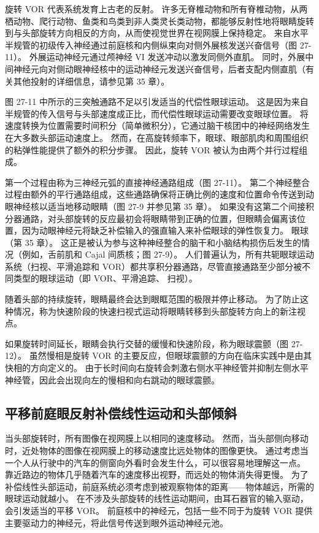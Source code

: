 旋转 VOR 代表系统发育上古老的反射。 许多无脊椎动物和所有脊椎动物，从两栖动物、爬行动物、鱼类和鸟类到非人类灵长类动物，都能够反射性地将眼睛旋转到与头部旋转方向相反的方向，从而使视觉世界在视网膜上保持稳定。 来自水平半规管的初级传入神经通过前庭核和内侧纵束向对侧外展核发送兴奋信号（图 27-11）。 外展运动神经元通过颅神经 VI 发送冲动以激发同侧外直肌。 同时，外展中间神经元向对侧动眼神经核中的运动神经元发送兴奋信号，后者支配内侧直肌（有关其他投射的详细信息，请参见第 35 章）。

图 27-11 中所示的三突触通路不足以引发适当的代偿性眼球运动。 这是因为来自半规管的传入信号与头部速度成正比，而代偿性眼球运动需要改变眼球位置。 将速度转换为位置需要时间积分（简单微积分），它通过脑干核团中的神经网络发生在大多数头部运动速度上。 然而，在高旋转频率下，眼球、眼部肌肉和周围组织的粘弹性能提供了额外的积分步骤。 因此，旋转 VOR 被认为由两个并行过程组成。

第一个过程由称为三神经元弧的直接神经通路组成（图 27-11）。 第二个神经整合过程由额外的平行通路组成，这些通路确保将正确比例的速度和位置命令传送到动眼神经核以适当地移动眼睛（图 27-9 并参见第 35 章）。 如果没有这第二个间接积分器通路，对头部旋转的反应最初会将眼睛带到正确的位置，但眼睛会偏离该位置，因为动眼神经元将缺乏补偿输入的强直输入来补偿眼球的弹性恢复力。 眼球（第 35 章）。 这正是被认为参与这种神经整合的脑干和小脑结构损伤后发生的情况（例如，舌前肌和 Cajal 间质核；图 27-9）。 人们普遍认为，所有共轭眼球运动系统（扫视、平滑追踪和 VOR）都共享积分器通路，尽管直接通路至少部分被不同类型的眼球运动（即 VOR、平滑追踪、 扫视）。

随着头部的持续旋转，眼睛最终会达到眼眶范围的极限并停止移动。 为了防止这种情况，称为快速阶段的快速扫视式运动将眼睛转移到头部旋转方向上的新注视点。

如果旋转时间延长，眼睛会执行交替的缓慢和快速阶段，称为眼球震颤（图 27-12）。 虽然慢相是旋转 VOR 的主要反应，但眼球震颤的方向在临床实践中是由其快相的方向定义的。 由于长时间向右旋转会刺激右侧水平神经管并抑制左侧水平神经管，因此会出现向左的慢相和向右跳动的眼球震颤。

\subsection{平移前庭眼反射补偿线性运动和头部倾斜}
当头部旋转时，所有图像在视网膜上以相同的速度移动。 然而，当头部侧向移动时，近处物体的图像在视网膜上的移动速度比远处物体的图像更快。 通过考虑当一个人从行驶中的汽车的侧窗向外看时会发生什么，可以很容易地理解这一点。 靠近路边的物体几乎随着汽车的速度移出视野，而远处的物体消失得更慢。 为了补偿线性头部运动，前庭系统必须考虑到被观察物体的距离——物体越远，所需的眼球运动就越小。 在不涉及头部旋转的线性运动期间，由耳石器官的输入驱动，会引发适当的平移 VOR。 前庭核中的神经元，包括一些不同于为旋转 VOR 提供主要驱动力的神经元，将此信号传送到眼外运动神经元池。

